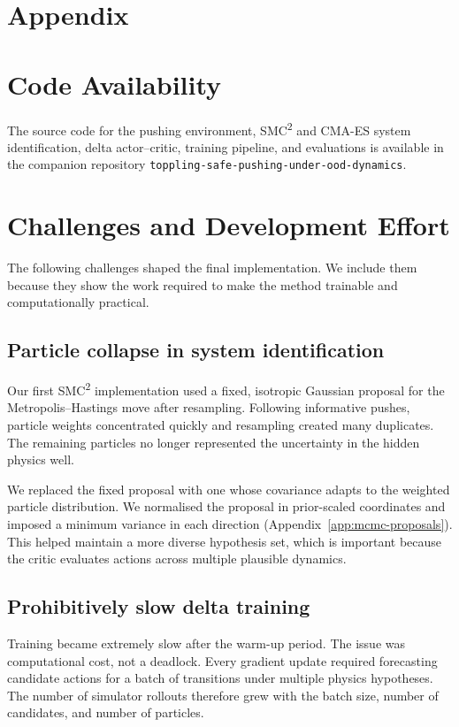 \documentclass[12pt]{article}
\begin{document}
\appendix
\section*{Appendix}
\setcounter{table}{0}
\section{Code Availability}\label{app:code}
The source code for the pushing environment, SMC\textsuperscript{2} and CMA-ES system identification, delta actor--critic, training pipeline, and evaluations is available in the companion repository \texttt{toppling-safe-pushing-under-ood-dynamics}.

\section{Challenges and Development Effort}\label{app:challenges}
The following challenges shaped the final implementation. We include them because they show the work required to make the method trainable and computationally practical.
\subsection{Particle collapse in system identification}
Our first SMC\textsuperscript{2} implementation used a fixed, isotropic Gaussian proposal for the Metropolis--Hastings move after resampling. Following informative pushes, particle weights concentrated quickly and resampling created many duplicates. The remaining particles no longer represented the uncertainty in the hidden physics well.

We replaced the fixed proposal with one whose covariance adapts to the weighted particle distribution. We normalised the proposal in prior-scaled coordinates and imposed a minimum variance in each direction (Appendix~\ref{app:mcmc-proposals}). This helped maintain a more diverse hypothesis set, which is important because the critic evaluates actions across multiple plausible dynamics.

\subsection{Prohibitively slow delta training}
Training became extremely slow after the warm-up period. The issue was computational cost, not a deadlock. Every gradient update required forecasting candidate actions for a batch of transitions under multiple physics hypotheses. The number of simulator rollouts therefore grew with the batch size, number of candidates, and number of particles.
\end{document}
